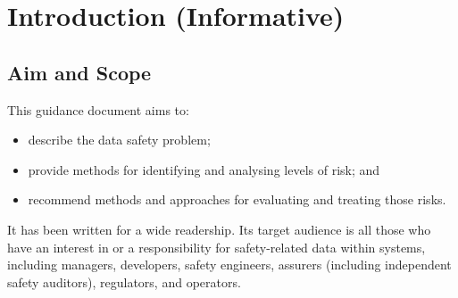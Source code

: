 %
%

%
%
\setcounter{page}{1}
\pagestyle{Standard} %
\thispagestyle{FirstPage}

\chapter{Introduction (Informative)} \label{bkm:introduction}


\section{Aim and Scope}
This guidance document aims to:
\begin{itemize}
	\item describe the data safety problem;
	\item provide methods for identifying and analysing levels of risk; and
	\item recommend methods and approaches for evaluating and treating those risks.
\end{itemize}

It has been written for a wide readership. Its target audience is all those who have an interest in or a responsibility for safety-related data within systems, including managers, developers, safety engineers, assurers (including independent safety auditors), regulators, and operators. 

